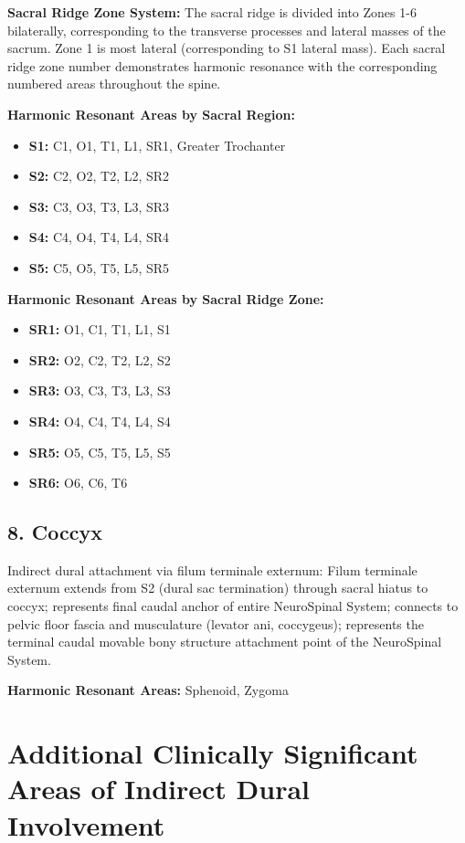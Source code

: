 \documentclass[11pt,letterpaper]{article}
\begin{document}
\textbf{Sacral Ridge Zone System:} The sacral ridge is divided into Zones 1-6 bilaterally, corresponding to the transverse processes and lateral masses of the sacrum. Zone 1 is most lateral (corresponding to S1 lateral mass). Each sacral ridge zone number demonstrates harmonic resonance with the corresponding numbered areas throughout the spine.


\textbf{Harmonic Resonant Areas by Sacral Region:}

\begin{itemize}
\item \textbf{S1:} C1, O1, T1, L1, SR1, Greater Trochanter
\item \textbf{S2:} C2, O2, T2, L2, SR2
\item \textbf{S3:} C3, O3, T3, L3, SR3
\item \textbf{S4:} C4, O4, T4, L4, SR4
\item \textbf{S5:} C5, O5, T5, L5, SR5
\end{itemize}

\textbf{Harmonic Resonant Areas by Sacral Ridge Zone:}

\begin{itemize}
\item \textbf{SR1:} O1, C1, T1, L1, S1
\item \textbf{SR2:} O2, C2, T2, L2, S2
\item \textbf{SR3:} O3, C3, T3, L3, S3
\item \textbf{SR4:} O4, C4, T4, L4, S4
\item \textbf{SR5:} O5, C5, T5, L5, S5
\item \textbf{SR6:} O6, C6, T6
\end{itemize}


\subsection{8. Coccyx}

Indirect dural attachment via filum terminale externum: Filum terminale externum extends from S2 (dural sac termination) through sacral hiatus to coccyx; represents final caudal anchor of entire NeuroSpinal System; connects to pelvic floor fascia and musculature (levator ani, coccygeus); represents the terminal caudal movable bony structure attachment point of the NeuroSpinal System.


\textbf{Harmonic Resonant Areas:} Sphenoid, Zygoma


\section{Additional Clinically Significant Areas of Indirect Dural Involvement}
\end{document}

